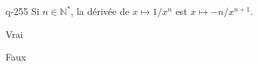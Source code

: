 \begin{truefalse}{q-255}
Si $n \in \mathbb N^*$, la dérivée de $x\mapsto 1/x^n$ est $x\mapsto -n/x^{n+1}$.
\item* Vrai
\item Faux
\end{truefalse}

